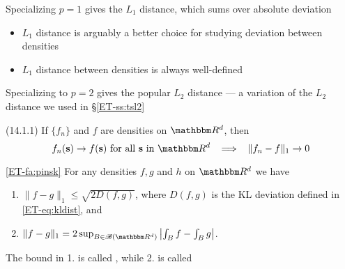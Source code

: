 \begin{frame}

    \vspace{2em}
    Specializing $p=1$ gives the $L_1$ distance, which sums over absolute
    deviation
    \begin{itemize}
        \item  $L_1$ distance is arguably a better choice for studying deviation
            between densities
        \item  $L_1$ distance between densities is
            always well-defined 
    \end{itemize}
    
    Specializing to $p=2$ gives the popular $L_2$ distance --- a
    variation of the $L_2$ distance we used in \S\ref{ET-ss:tsl2}
    
    \vspace{.7em}
    \Fact (14.1.1)
    If $\{f_n\}$ and $f$ are densities on $\RR^d$, then
    \begin{equation*}
        f_n(\bolds) \to f(\bolds)
        \text{ for all $\bolds$ in $\RR^d$}
        \;\; \implies \;\;
        \| f_n - f \|_1 \to 0
    \end{equation*}
    
\end{frame}

\begin{frame}

    \vspace{2em}
    \Fact
    \eqref{ET-fa:pinsk}
    For any densities $f, g$ and $h$ on $\RR^d$ we have
    \begin{enumerate}
        \item $\| f - g \|_1 \leq  \sqrt{ 2 D(f, g) }$, where $D(f, g)$ is
            the KL deviation defined in \eqref{ET-eq:kldist}, and
        \item $\| f - g \|_1 = 2 \sup_{B \in \bB(\RR^d)} \left| \int_B f -
            \int_B g \right|$.
    \end{enumerate}
    
    \vspace{.7em}
    The bound in 1. is called , while 2. is called
    
\end{frame}

